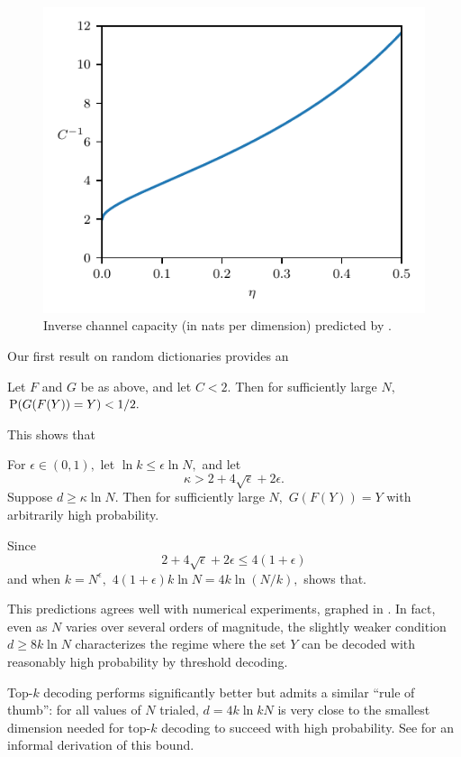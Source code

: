 \begin{figure}
	\begin{center}
	\includegraphics[width=0.5 \textwidth]{../figures/capacity}
	\caption{Inverse channel capacity (in nats per dimension) predicted by .}
	\label{fig:capacity}
	\end{center}
\end{figure}

Our first result on random dictionaries provides an

\begin{proposition} \label{prop:necessary-cond}
    Let $F$ and $G$ be as above, and let $C < 2.$ Then for sufficiently large $N,$ $\operatorname{P}(G(F(Y)) = Y) < 1/2.$
\end{proposition}

This shows that

\begin{proposition} \label{prop:sufficient-cond}
	For $\epsilon \in (0, 1),$ let $\ln k \le \epsilon \ln N,$ and let
	$$
	\kappa > 2 + 4 \sqrt \epsilon + 2 \epsilon.
	$$
	Suppose $d \ge \kappa \ln N.$ Then for sufficiently large $N,$ $G(F(Y)) = Y$ with arbitrarily high probability.
\end{proposition}

Since
$$
2 + 4 \sqrt \epsilon + 2 \epsilon \le 4(1  + \epsilon)
$$
and when $k = N^\epsilon,$ $4(1 + \epsilon) k \ln N = 4 k \ln (N / k),$  shows that.

This predictions agrees well with numerical experiments, graphed in . In fact, even as $N$ varies over several orders of magnitude, the slightly weaker condition $d \ge 8 k \ln N$ characterizes the regime where the set $Y$ can be decoded with reasonably high probability by threshold decoding.

Top-$k$ decoding performs significantly better but admits a similar ``rule of thumb'': for all values of $N$ trialed, $d = 4 k \ln k N$ is very close to the smallest dimension needed for top-$k$ decoding to succeed with high probability. See  for an informal derivation of this bound.

